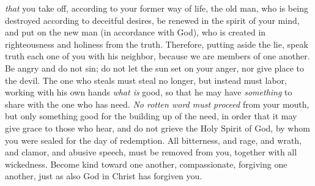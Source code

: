 \begin{biblechapter}
\verse \textit{that} you take off, according to your former way of life, the old man, who is being destroyed according to deceitful desires,
\verse be renewed in the spirit of your mind,
\verse and put on the new man (in accordance with God), who is created in righteousness and holiness from the truth.
 Therefore, putting aside the lie, speak truth each one of you with his neighbor, because we are members of one another.
\verse Be angry and do not sin; do not let the sun set on your anger,
\verse nor give place to the devil.
\verse The one who steals must steal no longer, but instead must labor, working with his own hands \textit{what is} good, so that he may have \textit{something} to share with the one who has need.
\verse \textit{No rotten word must proceed} from your mouth, but only something good for the building up of the need, in order that it may give grace to those who hear,
\verse and do not grieve the Holy Spirit of God, by whom you were sealed for the day of redemption.
\verse All bitterness, and rage, and wrath, and clamor, and abusive speech, must be removed from you, together with all wickedness.
\verse Become kind toward one another, compassionate, forgiving one another, just as also God in Christ has forgiven you.
\end{biblechapter}

